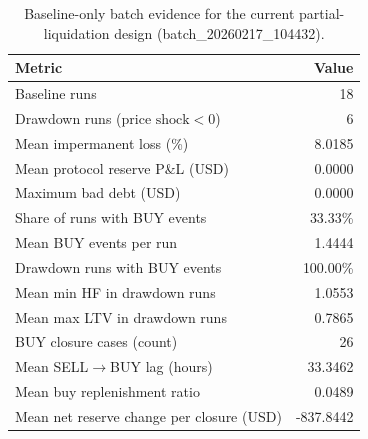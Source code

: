 \begin{table}[h!]
\centering
\caption{Baseline-only batch evidence for the current partial-liquidation design (batch\_20260217\_104432).}
\label{tab:baseline_batch_evidence}
\begin{tabular}{@{}lr@{}}
\toprule
Metric & Value \\
\midrule
Baseline runs & 18 \\
Drawdown runs ($\text{price shock}<0$) & 6 \\
Mean impermanent loss (\%) & 8.0185 \\
Mean protocol reserve P\&L (USD) & 0.0000 \\
Maximum bad debt (USD) & 0.0000 \\
Share of runs with BUY events & 33.33\% \\
Mean BUY events per run & 1.4444 \\
Drawdown runs with BUY events & 100.00\% \\
Mean min HF in drawdown runs & 1.0553 \\
Mean max LTV in drawdown runs & 0.7865 \\
BUY closure cases (count) & 26 \\
Mean SELL$\rightarrow$BUY lag (hours) & 33.3462 \\
Mean buy replenishment ratio & 0.0489 \\
Mean net reserve change per closure (USD) & -837.8442 \\
\bottomrule
\end{tabular}
\end{table}
